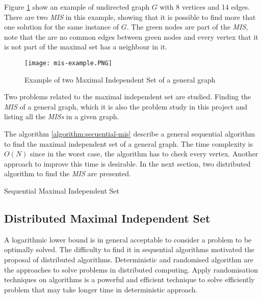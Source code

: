 Figure \ref{fig:graph1} show an example of undirected graph $G$ with 8 vertices and 14 edges. There are two \textit{MIS} in this example, showing that it is possible to find more that one solution for the same instance of $G$. The green nodes are part of the \textit{MIS}, note that the are no common edges between green nodes and every vertex that it is not part of the maximal set has a neighbour in it.
 
\begin{figure}[ht]
\centering
\texttt{[image: mis-example.PNG]} 
\caption{Example of two Maximal Independent Set of a general graph}
\label{fig:graph1}
\end{figure}

Two problems related to the maximal independent set are studied. Finding the \textit{MIS} of a general graph, which it is also the problem study in this project and listing all the \textit{MISs} in a given graph. 

The algorithm \ref{algorithm:secuential-mis} describe a general sequential algorithm to find the maximal independent set of a general graph. The time complexity is $O(N)$ since in the worst case, the algorithm has to check every vertex. Another approach to improve this time is desirable. In the next section, two distributed algorithm to find the \textit{MIS} are presented.



\begin{algorithm}
 \caption{Sequential Maximal Independent Set}
 \label{algorithm:secuential-mis} 

\SetAlgoNoLine
{}
    
 
\end{algorithm}
 
 
\subsection{Distributed Maximal Independent Set}

A logarithmic lower bound is in general acceptable to consider a problem to be optimally solved. The difficulty to find it in sequential algorithms motivated the proposal of distributed algorithms. Deterministic and randomised algorithm are the approaches to solve problems in distributed computing.  Apply randomisation techniques on algorithms is a powerful and efficient technique to solve efficiently problem that may take longer time in deterministic approach.

